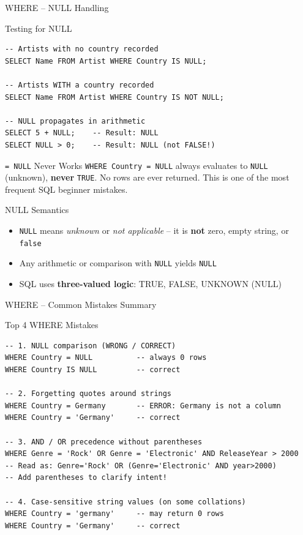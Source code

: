 \begin{frame}[fragile]{WHERE -- NULL Handling}
  \begin{block}{Testing for NULL}
\begin{lstlisting}[style=sqlstyle]
-- Artists with no country recorded
SELECT Name FROM Artist WHERE Country IS NULL;

-- Artists WITH a country recorded
SELECT Name FROM Artist WHERE Country IS NOT NULL;

-- NULL propagates in arithmetic
SELECT 5 + NULL;    -- Result: NULL
SELECT NULL > 0;    -- Result: NULL (not FALSE!)
\end{lstlisting}
  \end{block}

  \begin{alertblock}{\texttt{= NULL} Never Works}
    \texttt{WHERE Country = NULL} always evaluates to \texttt{NULL}
    (unknown), \textbf{never} \texttt{TRUE}. No rows are ever returned.
    This is one of the most frequent SQL beginner mistakes.
  \end{alertblock}

  \begin{block}{NULL Semantics}
    \begin{itemize}
      \item \texttt{NULL} means \emph{unknown} or \emph{not applicable} --
            it is \textbf{not} zero, empty string, or \texttt{false}
      \item Any arithmetic or comparison with \texttt{NULL} yields \texttt{NULL}
      \item SQL uses \textbf{three-valued logic}: TRUE, FALSE, UNKNOWN (NULL)
    \end{itemize}
  \end{block}
\end{frame}

\begin{frame}[fragile]{WHERE -- Common Mistakes Summary}
  \begin{alertblock}{Top 4 WHERE Mistakes}
\begin{lstlisting}[style=sqlstyle]
-- 1. NULL comparison (WRONG / CORRECT)
WHERE Country = NULL          -- always 0 rows
WHERE Country IS NULL         -- correct

-- 2. Forgetting quotes around strings
WHERE Country = Germany       -- ERROR: Germany is not a column
WHERE Country = 'Germany'     -- correct

-- 3. AND / OR precedence without parentheses
WHERE Genre = 'Rock' OR Genre = 'Electronic' AND ReleaseYear > 2000
-- Read as: Genre='Rock' OR (Genre='Electronic' AND year>2000)
-- Add parentheses to clarify intent!

-- 4. Case-sensitive string values (on some collations)
WHERE Country = 'germany'     -- may return 0 rows
WHERE Country = 'Germany'     -- correct
\end{lstlisting}
  \end{alertblock}
\end{frame}
